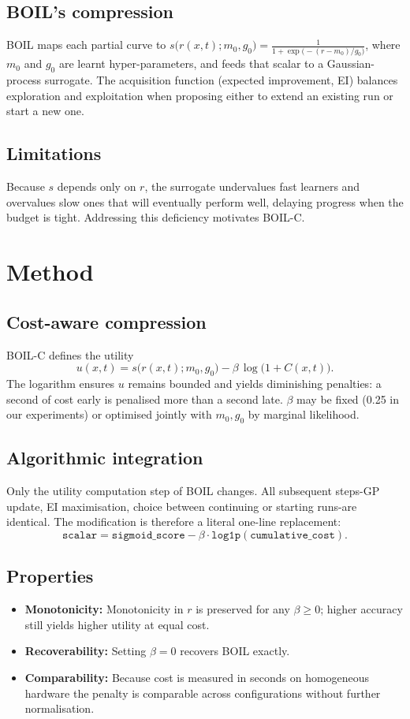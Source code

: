 \documentclass{article} %
\begin{document}
\subsection{BOIL's compression}
BOIL maps each partial curve to \(s\bigl(r(x,t); m_0, g_0\bigr) = \frac{1}{1 + \exp\bigl(- (r - m_0)/g_0\bigr)}\), where \(m_0\) and \(g_0\) are learnt hyper-parameters, and feeds that scalar to a Gaussian-process surrogate. The acquisition function (expected improvement, EI) balances exploration and exploitation when proposing either to extend an existing run or start a new one.

\subsection{Limitations}
Because \(s\) depends only on \(r\), the surrogate undervalues fast learners and overvalues slow ones that will eventually perform well, delaying progress when the budget is tight. Addressing this deficiency motivates BOIL-C.

\section{Method}
\label{sec:method}
\subsection{Cost-aware compression}
BOIL-C defines the utility
\[ u(x,t) = s\bigl(r(x,t); m_0, g_0\bigr) - \beta\,\log\bigl(1 + C(x,t)\bigr). \]
The logarithm ensures \(u\) remains bounded and yields diminishing penalties: a second of cost early is penalised more than a second late. \(\beta\) may be fixed (0.25 in our experiments) or optimised jointly with \(m_0, g_0\) by marginal likelihood.

\subsection{Algorithmic integration}
Only the utility computation step of BOIL changes. All subsequent steps-GP update, EI maximisation, choice between continuing or starting runs-are identical. The modification is therefore a literal one-line replacement:
\[ \texttt{scalar} = \texttt{sigmoid\_score} - \beta\cdot \texttt{log1p}(\texttt{cumulative\_cost}). \]

\subsection{Properties}
\begin{itemize}
  \item \textbf{Monotonicity:} Monotonicity in \(r\) is preserved for any \(\beta\ge 0\); higher accuracy still yields higher utility at equal cost.
  \item \textbf{Recoverability:} Setting \(\beta=0\) recovers BOIL exactly.
  \item \textbf{Comparability:} Because cost is measured in seconds on homogeneous hardware the penalty is comparable across configurations without further normalisation.
\end{itemize}
\end{document}
